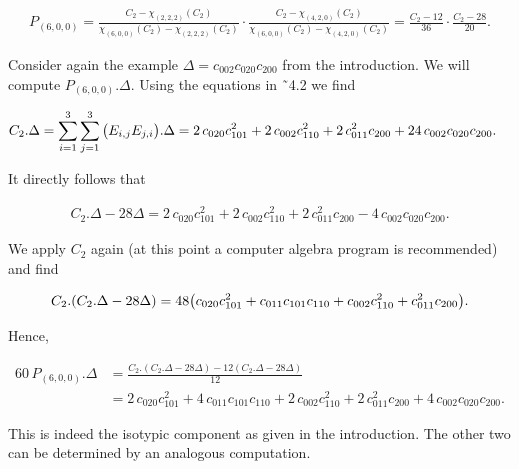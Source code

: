 \documentclass[10pt,a4paper]{article}
\begin{document}
\[\begin{aligned}
\displaystyle P_{(6,0,0)}=\frac{C_{2}-\chi_{(2,2,2)}(C_{2})}{\chi_{(6,0,0)}(C_{2})-\chi_{(2,2,2)}(C_{2})}\cdot\frac{C_{2}-\chi_{(4,2,0)}(C_{2})}{\chi_{(6,0,0)}(C_{2})-\chi_{(4,2,0)}(C_{2})}=\frac{C_{2}-12}{36}\cdot\frac{C_{2}-28}{20}.
\end{aligned}\]


Consider again the example $\Delta=c_{002}c_{020}c_{200}$ from the introduction.
We will compute $P_{(6,0,0)}.\Delta$. Using the equations in ˜4.2 we find



\[\begin{aligned}
\displaystyle C_{2}.\Delta & \displaystyle=\sum_{i=1}^{3}\sum_{j=1}^{3}\big{(}E_{i,j}E_{j,i}\big{)}.\Delta=2\,c_{020}c_{101}^{2}+2\,c_{002}c_{110}^{2}+2\,c_{011}^{2}c_{200}+24\,c_{002}c_{020}c_{200}.
\end{aligned}\]


It directly follows that



\[\begin{aligned}
\displaystyle C_{2}.\Delta-28\Delta=2\,c_{020}c_{101}^{2}+2\,c_{002}c_{110}^{2}+2\,c_{011}^{2}c_{200}-4\,c_{002}c_{020}c_{200}.
\end{aligned}\]


We apply $C_{2}$ again (at this point a computer algebra program is recommended) and find



\[\begin{aligned}
\displaystyle C_{2}.(C_{2}.\Delta-28\Delta)=48\big{(}c_{020}c_{101}^{2}+c_{011}c_{101}c_{110}+c_{002}c_{110}^{2}+c_{011}^{2}c_{200}\big{)}.
\end{aligned}\]


Hence,



\[\begin{aligned}
\displaystyle 60\,P_{(6,0,0)}.\Delta & \displaystyle=\frac{C_{2}.(C_{2}.\Delta-28\Delta)-12(C_{2}.\Delta-28\Delta)}{12} \\
 & \displaystyle=2\,c_{020}c_{101}^{2}+4\,c_{011}c_{101}c_{110}+2\,c_{002}c_{110}^{2}+2\,c_{011}^{2}c_{200}+4\,c_{002}c_{020}c_{200}.
\end{aligned}\]


This is indeed the isotypic component as given in the introduction.
The other two can be determined by an analogous computation.
\end{document}

